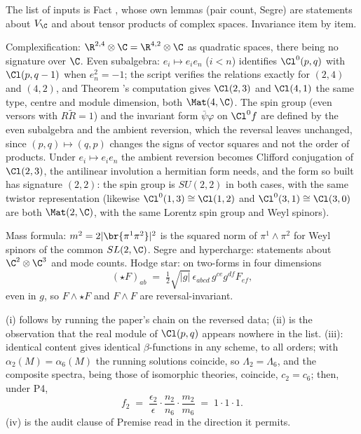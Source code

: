 The list of inputs is Fact , whose own lemmas (pair count, Segre) are statements about $V_{\C}$ and about tensor products of complex spaces. Invariance item by item.

Complexification: $\R^{2,4} \otimes \C = \R^{4,2} \otimes \C$ as quadratic spaces, there being no signature over $\C$. Even subalgebra: $e_{i} \mapsto e_{i}e_{n}$ ($i < n$) identifies $\Cl^{0}(p,q)$ with $\Cl(p, q-1)$ when $e_{n}^{2} = -1$; the script verifies the relations exactly for $(2,4)$ and $(4,2)$, and Theorem 's computation gives $\Cl(2,3)$ and $\Cl(4,1)$ the same type, centre and module dimension, both $\Mat(4,\C)$. The spin group (even versors with $R\tilde{R} = 1$) and the invariant form $\bar{\psi}\varphi$ on $\Cl^{0}f$ are defined by the even subalgebra and the ambient reversion, which the reversal leaves unchanged, since $(p,q) \mapsto (q,p)$ changes the signs of vector squares and not the order of products. Under $e_{i} \mapsto e_{i}e_{n}$ the ambient reversion becomes Clifford conjugation of $\Cl(2,3)$, the antilinear involution a hermitian form needs, and the form so built has signature $(2,2)$: the spin group is $SU(2,2)$ in both cases, with the same twistor representation (likewise $\Cl^{0}(1,3) \cong \Cl(1,2)$ and $\Cl^{0}(3,1) \cong \Cl(3,0)$ are both $\Mat(2,\C)$, with the same Lorentz spin group and Weyl spinors).

Mass formula: $m^{2} = 2|\br{\pi^{1}\pi^{2}}|^{2}$ is the squared norm of $\pi^{1} \wedge \pi^{2}$ for Weyl spinors of the common $SL(2,\C)$. Segre and hypercharge: statements about $\C^{2} \otimes \C^{3}$ and mode counts. Hodge star: on two-forms in four dimensions
\[
(\star F)_{ab} \;=\; \tfrac{1}{2}\sqrt{|g|}\,\epsilon_{abcd}\,g^{ce}g^{df}F_{ef},
\]
even in $g$, so $F \wedge \star F$ and $F \wedge F$ are reversal-invariant.

(i) follows by running the paper's chain on the reversed data; (ii) is the observation that the real module of $\Cl(p,q)$ appears nowhere in the list. (iii): identical content gives identical $\beta$-functions in any scheme, to all orders; with $\alpha_{2}(M) = \alpha_{6}(M)$ the running solutions coincide, so $\Lambda_{2} = \Lambda_{6}$, and the composite spectra, being those of isomorphic theories, coincide, $c_{2} = c_{6}$; then, under P4,
\[
f_{2} \;=\; \frac{\epsilon_{2}}{\epsilon}\cdot\frac{n_{2}}{n_{6}}\cdot\frac{m_{2}}{m_{6}} \;=\; 1 \cdot 1 \cdot 1 .
\] (iv) is the audit clause of Premise  read in the direction it permits.
